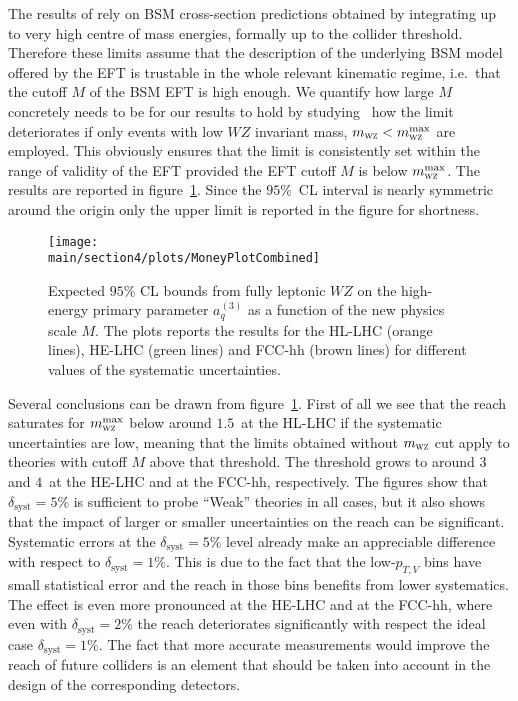 The results of   rely on BSM cross-section predictions obtained by integrating up to very high centre of mass energies, formally up to the collider threshold. Therefore these limits assume that the description of the underlying BSM model offered by the EFT is trustable in the whole relevant kinematic regime, i.e.~that the cutoff $M$ of the BSM EFT is high enough. We quantify how large $M$ concretely needs to be for our results to hold by studying~\cite{Racco:2015dxa,Pobbe:2017wrj,Biekoetter:2014jwa} how the limit deteriorates if only events with low $WZ$ invariant mass, $m_{\textsc{wz}}<m_{\textsc{wz}}^{\rm{max}}$ are employed. This obviously ensures that the limit is consistently set within the range of validity of the EFT provided the EFT cutoff $M$ is below $m_{\textsc{wz}}^{\rm{max}}$. The results are reported in figure~\ref{fig:bounds_future}. Since the $95\%$~CL interval is nearly symmetric around the origin only the upper limit is reported in the figure for shortness.

\begin{figure}[t]
\centering
\texttt{[image: \\main/section4/plots/MoneyPlotCombined]}
\caption{Expected $95\%$ CL bounds from fully leptonic $WZ$ on the high-energy primary parameter $a^{(3)}_q$ as a function of the new physics scale $M$. The plots reports the results for the HL-LHC (orange lines), HE-LHC (green lines) and FCC-hh (brown lines) for different
values of the systematic uncertainties.} 
\label{fig:bounds_future}
\end{figure}

Several conclusions can be drawn from figure~\ref{fig:bounds_future}. First of all we see that the reach saturates for $m_{\textsc{wz}}^{\rm{max}}$ below around $1.5$~\UTeV at the HL-LHC if the systematic uncertainties are low, meaning that the limits obtained without $m_{\textsc{wz}}$ cut apply to theories with cutoff $M$ above that threshold.  The threshold grows to around $3$ and $4$~\UTeV at the HE-LHC and at the FCC-hh, respectively. The figures show that $\delta_{\textrm{syst}}=5\%$ is sufficient to probe ``Weak'' theories in all cases, but it also shows that the impact of larger or smaller uncertainties on the reach can be significant. Systematic errors at the $\delta_{\textrm{syst}}=5\%$ level already make an appreciable difference with respect to $\delta_{\textrm{syst}}=1\%$. This is due to the fact that the low-$p_{T,V}$ bins have small statistical error and the reach in those bins benefits from lower systematics. The effect is even more pronounced at the HE-LHC and at the FCC-hh, where even with $\delta_{\textrm{syst}}=2\%$ the reach deteriorates significantly with respect the ideal case $\delta_{\textrm{syst}}=1\%$. The fact that more accurate measurements would improve the reach of future colliders is an element that should be taken into account in the design of the corresponding detectors.

